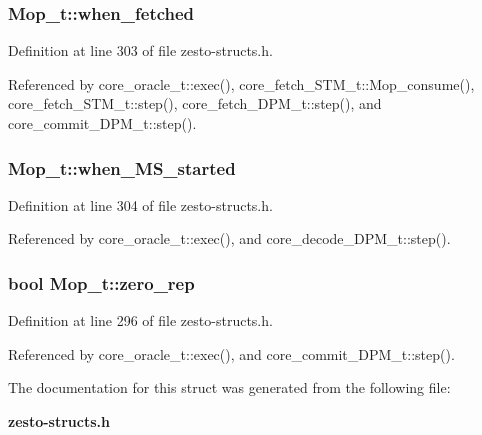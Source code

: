 \subsubsection[{when\_\-fetched}]{ {\bf Mop\_\-t::when\_\-fetched}}\label{structMop__t_9e740f401f882c0173adc702cea64834}




Definition at line 303 of file zesto-structs.h.

Referenced by core\_\-oracle\_\-t::exec(), core\_\-fetch\_\-STM\_\-t::Mop\_\-consume(), core\_\-fetch\_\-STM\_\-t::step(), core\_\-fetch\_\-DPM\_\-t::step(), and core\_\-commit\_\-DPM\_\-t::step().
\subsubsection[{when\_\-MS\_\-started}]{ {\bf Mop\_\-t::when\_\-MS\_\-started}}\label{structMop__t_7c4a056d45928f498938f5a5b96bc3f0}




Definition at line 304 of file zesto-structs.h.

Referenced by core\_\-oracle\_\-t::exec(), and core\_\-decode\_\-DPM\_\-t::step().
\subsubsection[{zero\_\-rep}]{\setlength{\rightskip}{0pt plus 5cm}bool {\bf Mop\_\-t::zero\_\-rep}}\label{structMop__t_4b7707567ffe0d3d712027c190dde6b1}




Definition at line 296 of file zesto-structs.h.

Referenced by core\_\-oracle\_\-t::exec(), and core\_\-commit\_\-DPM\_\-t::step().

The documentation for this struct was generated from the following file:\begin{CompactItemize}
\item 
{\bf zesto-structs.h}\end{CompactItemize}
